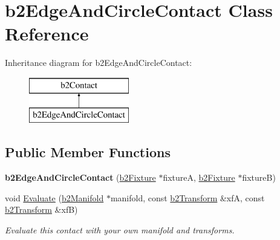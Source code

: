 \hypertarget{classb2_edge_and_circle_contact}{}\section{b2\+Edge\+And\+Circle\+Contact Class Reference}
\label{classb2_edge_and_circle_contact}
Inheritance diagram for b2\+Edge\+And\+Circle\+Contact\+:\begin{figure}[H]
\begin{center}
\leavevmode
\includegraphics[height=2.000000cm]{classb2_edge_and_circle_contact}
\end{center}
\end{figure}
\subsection*{Public Member Functions}
\begin{DoxyCompactItemize}
\item 
{\bfseries b2\+Edge\+And\+Circle\+Contact} (\hyperlink{classb2_fixture}{b2\+Fixture} $\ast$fixtureA, \hyperlink{classb2_fixture}{b2\+Fixture} $\ast$fixtureB)\hypertarget{classb2_edge_and_circle_contact_a9de91d6afe4d2407f679b2ccaded9c02}{}\label{classb2_edge_and_circle_contact_a9de91d6afe4d2407f679b2ccaded9c02}

\item 
void \hyperlink{classb2_edge_and_circle_contact_a8f083c4c7c7da83eae38975164fd1452}{Evaluate} (\hyperlink{structb2_manifold}{b2\+Manifold} $\ast$manifold, const \hyperlink{structb2_transform}{b2\+Transform} \&xfA, const \hyperlink{structb2_transform}{b2\+Transform} \&xfB)\hypertarget{classb2_edge_and_circle_contact_a8f083c4c7c7da83eae38975164fd1452}{}\label{classb2_edge_and_circle_contact_a8f083c4c7c7da83eae38975164fd1452}

\begin{DoxyCompactList}\small\item\em Evaluate this contact with your own manifold and transforms. \end{DoxyCompactList}\end{DoxyCompactItemize}
